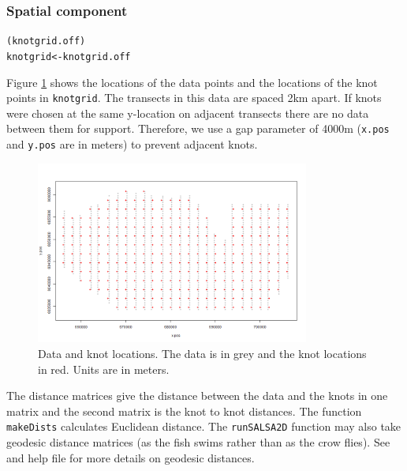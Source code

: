 \begin{frame}[fragile]
\frametitle{Spatial component}
\begin{knitrout}\footnotesize
{}\color{fgcolor}\begin{kframe}
\begin{alltt}
(knotgrid.off)
knotgrid <- knotgrid.off
\end{alltt}
\end{kframe}
\end{knitrout}

\noindent Figure \ref{fig:knotgrid} shows the locations of the data points and the locations of the knot points in {\tt knotgrid}.  The transects in this data are spaced 2km apart.  If knots were chosen at the same y-location on adjacent transects there are no data between them for support.  Therefore, we use a gap parameter of 4000m ({\tt x.pos} and {\tt y.pos} are in meters) to prevent adjacent knots.

\begin{figure}[h]
	\centering
	\includegraphics[width=9cm]{knotgrid.png}
	\caption{Data and knot locations.  The data is in grey and the knot locations in red.  Units are in meters.}
	\label{fig:knotgrid}
\end{figure}

\noindent The distance matrices give the distance between the data and the knots in one matrix and the second matrix is the knot to knot distances.  The function {\tt makeDists} calculates Euclidean distance. The {\tt runSALSA2D} function may also take geodesic distance matrices (as the fish swims rather than as the crow flies).  See \citet{ScottH2013} and help file for more details on geodesic distances.


\end{frame}
